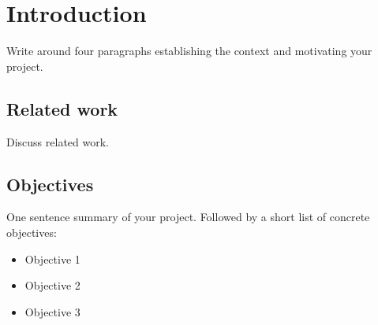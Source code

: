 \chapter{Introduction}
\label{ch:introduction}

Write around four paragraphs establishing the context and motivating your project.

\section{Related work}

Discuss related work.

\section{Objectives}

One sentence summary of your project. Followed by a short list of concrete objectives:

\begin{itemize}
    \item Objective 1
    \item Objective 2
    \item Objective 3
\end{itemize}